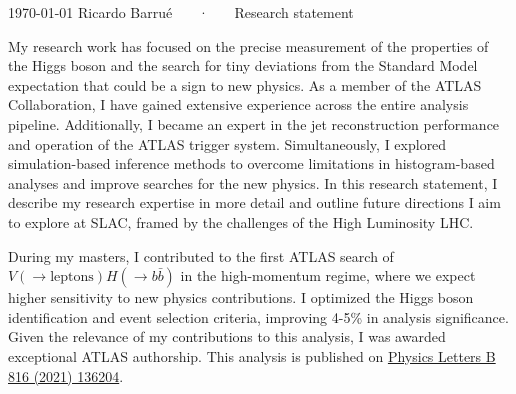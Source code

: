 \documentclass[11pt, a4paper]{awesome-cv}
\begin{document}
\makecvheader[R]

\makecvfooter
  {\today}
  {Ricardo Barrué ~~~·~~~ Research statement}
  {}

\makelettertitle

\begin{cvletter}

  My research work has focused on the precise measurement of the properties of the Higgs boson and the search for tiny deviations from the Standard Model expectation that could be a sign to new physics. As a member of the ATLAS Collaboration, I have gained extensive experience across the entire analysis pipeline. Additionally, I became an expert in the jet reconstruction performance and operation of the ATLAS trigger system. Simultaneously, I explored simulation-based inference methods to overcome limitations in histogram-based analyses and improve searches for the new physics. In this research statement, I describe my research expertise in more detail and outline future directions I aim to explore at SLAC, framed by the challenges of the High Luminosity LHC.

  
  During my masters, I contributed to the first ATLAS search of $V(\to \textrm{leptons})H(\to b\bar{b})$ in the high-momentum regime, where we expect higher sensitivity to new physics contributions. I optimized the Higgs boson identification and event selection criteria, improving 4-5\% in analysis significance. Given the relevance of my contributions to this analysis, I was awarded exceptional ATLAS authorship. This analysis is published on \href{https://doi.org/10.1016/j.physletb.2021.136204}{Physics Letters B 816 (2021) 136204}.
  

\end{cvletter}
\end{document}
